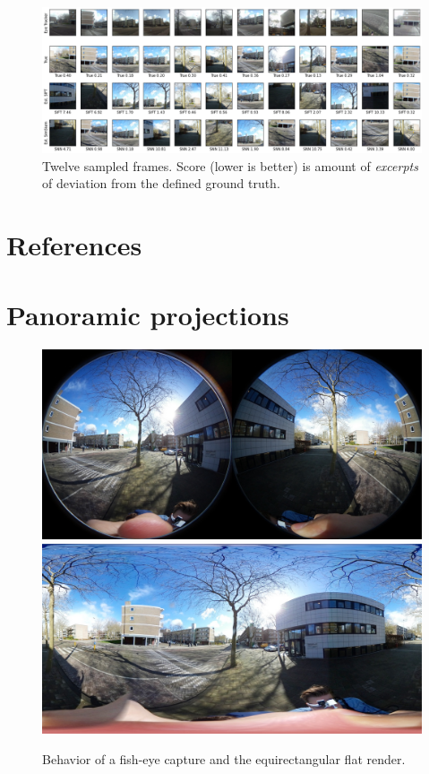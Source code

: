 \documentclass[sigconf, natbib=false, nonacm]{acmart}
\begin{document}
\begin{landscape}
    \begin{figure}
        \includegraphics[width=\linewidth]{figures/4-res-comparisons.png}
        \caption{Twelve sampled frames. Score (lower is better) is amount of \emph{excerpts} of deviation from the defined ground truth.}
        \label{fig:4-res-comparisons}
    \end{figure} 
\end{landscape}

\section{References}
\printbibliography[heading=none]

\appendix
\section{Panoramic projections}
\begin{figure}[h]
    \includegraphics[width=\linewidth]{figures/2-met-fisheye.JPG}
    \includegraphics[width=\linewidth]{figures/2-met-stitched.JPG}
    \caption{Behavior of a fish-eye capture and the equirectangular flat render.}
    \label{fig:2-met-fisheye-stitched}
\end{figure}
\end{document}
